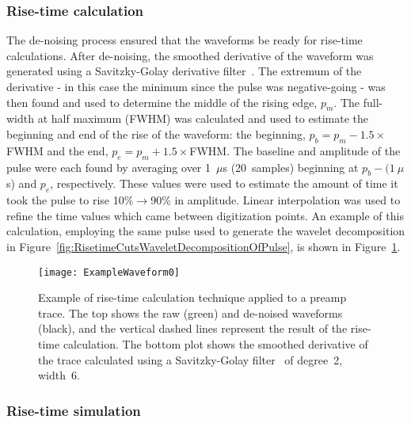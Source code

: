 			\subsubsection{Rise-time calculation}
			\label{sec:RisetimeCalculation}
	The de-noising process ensured that the waveforms be ready for rise-time calculations.  After de-noising, the smoothed derivative of the waveform was generated using a Savitzky-Golay derivative filter~\cite{Sav64aa}.  The extremum of the derivative - in this case the minimum since the pulse was negative-going - was then found and used to determine the middle of the rising edge, $p_{m}$.  The full-width at half maximum (FWHM) was calculated and used to estimate the beginning and end of the rise of the waveform: the beginning, $p_{b} = p_{m} - 1.5\times$FWHM and the end, $p_{e} = p_{m} + 1.5\times$FWHM.  The baseline and amplitude of the pulse were each found by averaging over 1~$\mu$s (20~samples) beginning at $p_{b} - (1~\mu$s) and $p_{e}$, respectively.  These values were used to estimate the amount of time it took the pulse to rise 10\%$\to$90\% in amplitude.  Linear interpolation was used to refine the time values which came between digitization points.  An example of this calculation, employing the same pulse used to generate the wavelet decomposition in Figure~\ref{fig:RisetimeCutsWaveletDecompositionOfPulse}, is shown in Figure~\ref{fig:RisetimeCutsExampleOfPulse}.  
		
				\begin{figure}
					\centering
					\texttt{[image: ExampleWaveform0]}
					\caption[Example of rise-time calculation technique applied to a preamp trace]
					{Example of rise-time calculation technique applied to a preamp trace.  
					The top shows the raw (green) and de-noised waveforms (black), and the vertical dashed lines represent the result 
					of the rise-time calculation.  The bottom plot shows the smoothed derivative of the trace calculated 
					using a Savitzky-Golay filter~\cite{Sav64aa} of degree~2, width~6.}
					\label{fig:RisetimeCutsExampleOfPulse}
				\end{figure}					

			\subsubsection{Rise-time simulation}
			\label{sec:RisetimeSimulation}
	
